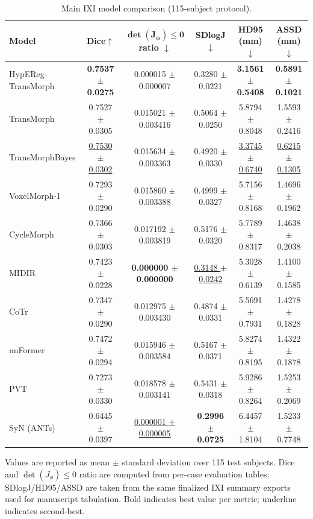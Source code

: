 \documentclass[jimaging,article,submit,pdftex,moreauthors]{Definitions/mdpi}
\begin{document}
\begin{table}[H]
\caption{Main IXI model comparison (115-subject protocol).\label{tab2}}
\centering
\scriptsize
\setlength{\tabcolsep}{3pt}
\begin{tabularx}{\textwidth}{lccccc}
\toprule
\textbf{Model} & \textbf{Dice\(\uparrow\)} & \(\boldsymbol{\det(J_\phi)\le 0}\) \textbf{ratio \(\downarrow\)} & \textbf{SDlogJ\(\downarrow\)} & \textbf{HD95 (mm)\(\downarrow\)} & \textbf{ASSD (mm)\(\downarrow\)}\\
\midrule
HypEReg-TransMorph & \textbf{0.7537 \(\pm\) 0.0275} & 0.000015 \(\pm\) 0.000007 & 0.3280 \(\pm\) 0.0221 & \textbf{3.1561 \(\pm\) 0.5408} & \textbf{0.5891 \(\pm\) 0.1021}\\
TransMorph & 0.7527 \(\pm\) 0.0305 & 0.015021 \(\pm\) 0.003416 & 0.5064 \(\pm\) 0.0250 & 5.8794 \(\pm\) 0.8048 & 1.5593 \(\pm\) 0.2416\\
TransMorphBayes & \underline{0.7530 \(\pm\) 0.0302} & 0.015634 \(\pm\) 0.003363 & 0.4920 \(\pm\) 0.0330 & \underline{3.3745 \(\pm\) 0.6740} & \underline{0.6215 \(\pm\) 0.1305}\\
VoxelMorph-1 & 0.7293 \(\pm\) 0.0290 & 0.015860 \(\pm\) 0.003388 & 0.4999 \(\pm\) 0.0327 & 5.7156 \(\pm\) 0.8168 & 1.4696 \(\pm\) 0.1962\\
CycleMorph & 0.7366 \(\pm\) 0.0303 & 0.017192 \(\pm\) 0.003819 & 0.5176 \(\pm\) 0.0320 & 5.7789 \(\pm\) 0.8317 & 1.4638 \(\pm\) 0.2038\\
MIDIR & 0.7423 \(\pm\) 0.0228 & \textbf{0.000000 \(\pm\) 0.000000} & \underline{0.3148 \(\pm\) 0.0242} & 5.3028 \(\pm\) 0.6139 & 1.4100 \(\pm\) 0.1585\\
CoTr & 0.7347 \(\pm\) 0.0290 & 0.012975 \(\pm\) 0.003430 & 0.4874 \(\pm\) 0.0331 & 5.5691 \(\pm\) 0.7931 & 1.4278 \(\pm\) 0.1828\\
nnFormer & 0.7472 \(\pm\) 0.0294 & 0.015946 \(\pm\) 0.003584 & 0.5167 \(\pm\) 0.0371 & 5.8274 \(\pm\) 0.8195 & 1.4322 \(\pm\) 0.1878\\
PVT & 0.7273 \(\pm\) 0.0330 & 0.018578 \(\pm\) 0.003141 & 0.5431 \(\pm\) 0.0318 & 5.9286 \(\pm\) 0.8264 & 1.5253 \(\pm\) 0.2069\\
SyN (ANTs) & 0.6445 \(\pm\) 0.0397 & \underline{0.000001 \(\pm\) 0.000005} & \textbf{0.2996 \(\pm\) 0.0725} & 6.4457 \(\pm\) 1.8104 & 1.5233 \(\pm\) 0.7748\\
\bottomrule
\end{tabularx}
\parbox{\textwidth}{\footnotesize Values are reported as mean \(\pm\) standard deviation over 115 test subjects. Dice and \(\det(J_\phi)\le 0\) ratio are computed from per-case evaluation tables; SDlogJ/HD95/ASSD are taken from the same finalized IXI summary exports used for manuscript tabulation. Bold indicates best value per metric; underline indicates second-best.}
\end{table}
\end{document}
